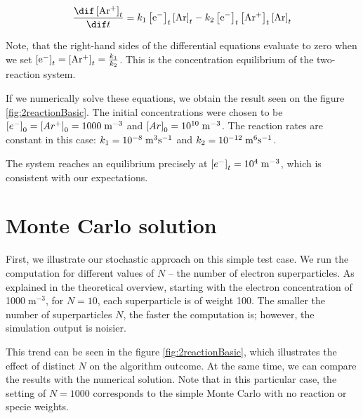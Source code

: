 $$\frac{\dif \left[\rm Ar^{+}\right]_t}{\dif t} = k_1\left[ \rm e^{-}\right]_t \left[ \rm Ar\right]_t - k_2 \left[ \rm e^{-}\right]_t \left[ \rm Ar^{+}\right]_t \left[ \rm Ar\right]_t$$

Note, that the right-hand sides of the differential equations evaluate to zero when we set $\left[ \rm e^{-}\right]_t = \left[\rm Ar^{+}\right]_t = \frac{k_1}{k_2}$. This is the concentration equilibrium of the two-reaction system. 

If we numerically solve these equations, we obtain the result seen on the figure \ref{fig:2reactionBasic}. 
The initial concentrations were chosen to be $\left[e^{-}\right]_0 = \left[Ar^{+}\right]_0 = 1000\;\rm m^{-3}$ and $\left[Ar\right]_0 = 10^{10}\;\rm m^{-3}$. The reaction rates are constant in this case: $k_1 = 10^{-8} \;\rm m^{3} \rm s^{-1}$ and $k_2 = 10^{-12} \;\rm m^{6} \rm s^{-1}$. 

The system reaches an equilibrium precisely at $\left[e^{-}\right]_t = 10^{4}\;\rm m^{-3}$, which is consistent with our expectations.


\section{Monte Carlo solution}

First, we illustrate our stochastic approach on this simple test case. We run the computation for different values of $N$ -- the number of electron superparticles. As explained in the theoretical overview, starting with the electron concentration of 1000$\;$m$^{-3}$, for $N = 10$, each superparticle is of weight 100. The smaller the number of superparticles $N$, the faster the computation is; however, the simulation output is noisier. 

This trend can be seen in the figure \ref{fig:2reactionBasic}, which illustrates the effect of distinct $N$ on the algorithm outcome. At the same time, we can compare the results with the numerical solution. Note that in this particular case, the setting of $N = 1000$ corresponds to the simple Monte Carlo with no reaction or specie weights.

